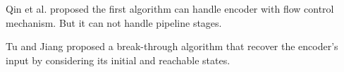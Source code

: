 \documentclass[conference]{IEEEtran}
\begin{document}
Qin et al. \cite{QinTODAES15}
proposed the first algorithm can handle encoder with flow control mechanism.
But it can not handle pipeline stages.

Tu and Jiang \cite{TuDAC13} proposed a break-through algorithm 
that recover the encoder's input by considering its initial and reachable states.

%
%
%
%
\end{document}
